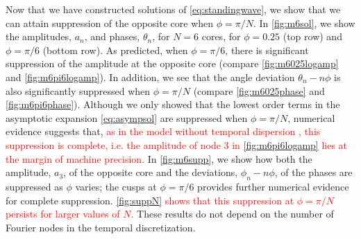 \documentclass[11pt,reqno]{amsart}
\newcommand{\revised}[1]{ \textcolor{red}{#1} }
\begin{document}
Now that we have constructed solutions of \cref{eq:standingwave}, we show that we can attain suppression of the opposite core when $\phi=\pi/N$. In \cref{fig:m6sol}, we show the amplitudes, $a_n$, and phases, $\theta_n$, for $N=6$ cores, for $\phi=0.25$ (top row) and $\phi=\pi/6$ (bottom row). As predicted, when $\phi=\pi/6$, there is significant suppression of the amplitude at the opposite core (compare \cref{fig:m6025logamp} and \cref{fig:m6pi6logamp}). In addition, we see that the angle deviation $\theta_n - n \phi$ is also significantly suppressed when $\phi=\pi/N$ (compare \cref{fig:m6025phase} and \cref{fig:m6pi6phase}). Although we only showed that the lowest order terms in the asymptotic expansion \cref{eq:asympsol} are suppressed when $\phi=\pi/N$, numerical evidence suggests that,
\revised{
as in the model without temporal dispersion \cite{parker2021}, this suppression is complete, i.e. the amplitude of node 3 in \cref{fig:m6pi6logamp} lies at the margin of machine precision.    
}
In \cref{fig:m6supp}, we show how both the amplitude, $a_3$, of the opposite core and the deviations, $\phi_n - n \phi$, of the phases are suppressed as $\phi$ varies; the cusps at $\phi=\pi/6$ provides further numerical evidence for complete suppression. 
\revised{\cref{fig:suppN} shows that this suppression at $\phi=\pi/N$ persists for larger values of $N$.
}
These results do not depend on the number of Fourier nodes in the temporal discretization.
\end{document}
